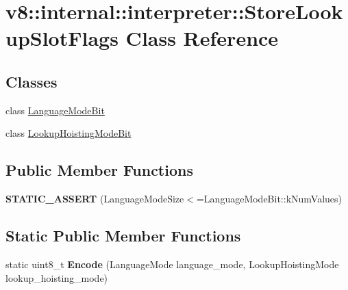 \hypertarget{classv8_1_1internal_1_1interpreter_1_1StoreLookupSlotFlags}{}\section{v8\+:\+:internal\+:\+:interpreter\+:\+:Store\+Lookup\+Slot\+Flags Class Reference}
\label{classv8_1_1internal_1_1interpreter_1_1StoreLookupSlotFlags}
\subsection*{Classes}
\begin{DoxyCompactItemize}
\item 
class \mbox{\hyperlink{classv8_1_1internal_1_1interpreter_1_1StoreLookupSlotFlags_1_1LanguageModeBit}{Language\+Mode\+Bit}}
\item 
class \mbox{\hyperlink{classv8_1_1internal_1_1interpreter_1_1StoreLookupSlotFlags_1_1LookupHoistingModeBit}{Lookup\+Hoisting\+Mode\+Bit}}
\end{DoxyCompactItemize}
\subsection*{Public Member Functions}
\begin{DoxyCompactItemize}
\item 
\mbox{\label{classv8_1_1internal_1_1interpreter_1_1StoreLookupSlotFlags_a26dac700bff9af4dd49906409ac6a06e}} 
{\bfseries S\+T\+A\+T\+I\+C\+\_\+\+A\+S\+S\+E\+RT} (Language\+Mode\+Size$<$=Language\+Mode\+Bit\+::k\+Num\+Values)
\end{DoxyCompactItemize}
\subsection*{Static Public Member Functions}
\begin{DoxyCompactItemize}
\item 
\mbox{\label{classv8_1_1internal_1_1interpreter_1_1StoreLookupSlotFlags_ab67ff80ba394f7b035ef5d02167db7f9}} 
static uint8\+\_\+t {\bfseries Encode} (Language\+Mode language\+\_\+mode, Lookup\+Hoisting\+Mode lookup\+\_\+hoisting\+\_\+mode)
\end{DoxyCompactItemize}


